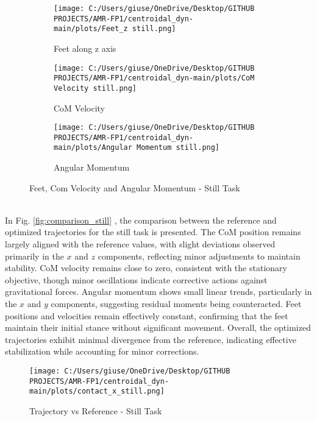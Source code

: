 \documentclass[main.tex]{subfiles}
\begin{document}
\begin{sloppypar}
\begin{figure}[htbp]
    \centering
    \begin{subfigure}[b]{0.32\textwidth}
        \centering
        \texttt{[image: C:/Users/giuse/OneDrive/Desktop/GITHUB PROJECTS/AMR-FP1/centroidal\_dyn-main/plots/Feet\_z still.png]}
        \caption{Feet along z axis}
        \label{fig:feet_z_still}
    \end{subfigure}
    \hfill
    \begin{subfigure}[b]{0.32\textwidth}
        \centering
        \texttt{[image: C:/Users/giuse/OneDrive/Desktop/GITHUB PROJECTS/AMR-FP1/centroidal\_dyn-main/plots/CoM Velocity still.png]}
        \caption{CoM Velocity}
        \label{fig:com_velocity_still}
    \end{subfigure}
    \hfill
    \begin{subfigure}[b]{0.32\textwidth}
        \centering
        \texttt{[image: C:/Users/giuse/OneDrive/Desktop/GITHUB PROJECTS/AMR-FP1/centroidal\_dyn-main/plots/Angular Momentum still.png]}
        \caption{Angular Momentum}
        \label{fig:angular_momentum_still}
    \end{subfigure}
    \caption{Feet, Com Velocity and Angular Momentum - Still Task}
    \label{fig:three_still}
\end{figure}
\\
In Fig. \ref{fig:comparison_still} , the comparison between the reference and optimized trajectories for the still task is presented. The CoM position remains largely aligned with the reference values, with slight deviations observed primarily in the $x$ and $z$ components, reflecting minor adjustments to maintain stability. CoM velocity remains close to zero, consistent with the stationary objective, though minor oscillations indicate corrective actions against gravitational forces. Angular momentum shows small linear trends, particularly in the $x$ and $y$ components, suggesting residual moments being counteracted. Feet positions and velocities remain effectively constant, confirming that the feet maintain their initial stance without significant movement. Overall, the optimized trajectories exhibit minimal divergence from the reference, indicating effective stabilization while accounting for minor corrections.
\begin{figure}[htbp]
    \centering
    \texttt{[image: C:/Users/giuse/OneDrive/Desktop/GITHUB PROJECTS/AMR-FP1/centroidal\_dyn-main/plots/contact\_x\_still.png]}
    \caption{Trajectory vs Reference - Still Task}

\end{figure}
\end{sloppypar}
\end{document}
